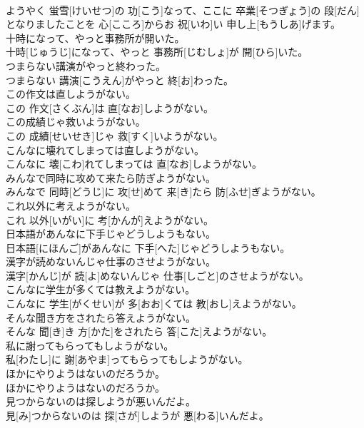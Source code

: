 \documentclass[8pt]{extreport}
\begin{document}
\begin{CJK}{UTF8}{min}
\\	ようやく 蛍雪[けいせつ]の 功[こう]なって、ここに 卒業[そつぎょう]の 段[だん]となりましたことを 心[こころ]からお 祝[いわ]い 申し上[もうしあ]げます。
\\	十時になって、やっと事務所が開いた。	
\\	十時[じゅうじ]になって、やっと 事務所[じむしょ]が 開[ひら]いた。
\\	つまらない講演がやっと終わった。	
\\	つまらない 講演[こうえん]がやっと 終[お]わった。
\\	この作文は直しようがない。	
\\	この 作文[さくぶん]は 直[なお]しようがない。
\\	この成績じゃ救いようがない。	
\\	この 成績[せいせき]じゃ 救[すく]いようがない。
\\	こんなに壊れてしまっては直しようがない。	
\\	こんなに 壊[こわ]れてしまっては 直[なお]しようがない。
\\	みんなで同時に攻めて来たら防ぎようがない。	
\\	みんなで 同時[どうじ]に 攻[せ]めて 来[き]たら 防[ふせ]ぎようがない。
\\	これ以外に考えようがない。	
\\	これ 以外[いがい]に 考[かんが]えようがない。
\\	日本語があんなに下手じゃどうしようもない。	
\\	日本語[にほんご]があんなに 下手[へた]じゃどうしようもない。
\\	漢字が読めないんじゃ仕事のさせようがない。	
\\	漢字[かんじ]が 読[よ]めないんじゃ 仕事[しごと]のさせようがない。
\\	こんなに学生が多くては教えようがない。	
\\	こんなに 学生[がくせい]が 多[おお]くては 教[おし]えようがない。
\\	そんな聞き方をされたら答えようがない。	
\\	そんな 聞[き]き 方[かた]をされたら 答[こた]えようがない。
\\	私に謝ってもらってもしようがない。	
\\	私[わたし]に 謝[あやま]ってもらってもしようがない。
\\	ほかにやりようはないのだろうか。	
\\	ほかにやりようはないのだろうか。
\\	見つからないのは探しようが悪いんだよ。	
\\	見[み]つからないのは 探[さが]しようが 悪[わる]いんだよ。

\end{CJK}
\end{document}
